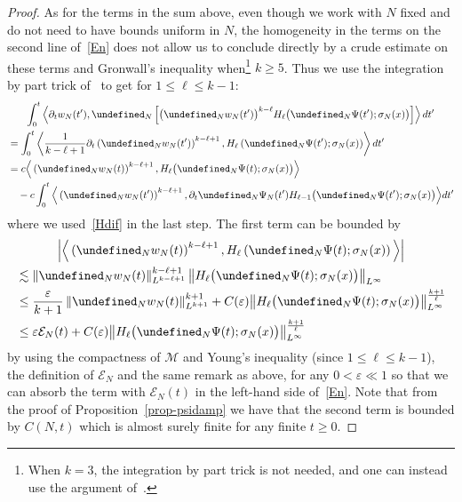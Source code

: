 \documentclass[AHL,Unicode,longabstracts,published]{cedram}
\let\P= \undefined
\newcommand{\P}{\mathbf{P}}
\newcommand{\En}{\mathcal{E}}
\newcommand{\M}{\mathcal{M}}
\newcommand{\eps}{\varepsilon}
\newcommand{\s}{\sigma}
\newcommand{\dt}{\partial_t}
\newcommand{\les}{\lesssim}
\begin{document}
\begin{proof}
As for the terms in the sum above, even though we work with $N$ fixed and do not need to have bounds uniform in $N$, the homogeneity in the terms on the second line of~\eqref{En} does not allow us to conclude directly by a crude estimate on these terms and Gronwall's inequality when\footnote{When $k=3$, the integration by part trick is not needed, and one can instead use the argument of~\cite{BT3}.} $k\ge 5$. Thus we use the integration by part trick of~\cite{OP} to get for $1\le \ell \le k-1$:
\begin{multline*}
\int_0^t\left\langle \dt w_N(t'),\P_N\left[\big(\P_Nw_N(t')\big)^{k-\ell}H_{\ell}\big(\P_N\Psi(t');\s_N(x)\big)\right]\right\rangle dt'\\
\begin{aligned}
& = \int_0^t\left\langle \frac1{k-\ell+1}\dt \left(\P_Nw_N(t')\right)^{k-\ell+1},H_{\ell}\left(\P_N\Psi(t');\s_N(x)\right)\right\rangle dt'\\
& = c\Big\langle \left(\P_Nw_N(t)\right)^{k-\ell+1},H_{\ell}\big(\P_N\Psi(t);\s_N(x)\big)\Big\rangle\\
&\quad- c\int_0^t\Big\langle \left(\P_Nw_N(t')\right)^{k-\ell+1},\dt\P_N\Psi_N(t') H_{\ell-1}\big(\P_N\Psi(t');\s_N(x)\big)\Big\rangle dt'
\end{aligned}
\end{multline*}
where we used~\eqref{Hdif} in the last step. The first term can be bounded by
\begin{multline*}
\Big|\Big\langle \left(\P_Nw_N(t)\right)^{k-\ell+1},H_{\ell}\left(\P_N\Psi(t);\s_N(x)\right)\Big\rangle\Big|\\
\begin{aligned}
&\les \left\|\P_Nw_N(t)\right\|_{L^{k-\ell+1}}^{k-\ell+1}\big\|H_{\ell}\big(\P_N\Psi(t);\s_N(x)\big)\big\|_{L^\infty}\\
&\le \frac{\eps}{k+1} \left\|\P_Nw_N(t)\right\|_{L^{k+1}}^{k+1} + C(\eps)\big\|H_{\ell}\big(\P_N\Psi(t);\s_N(x)\big)\big\|_{L^\infty}^{\frac{k+1}{\ell}}\\
& \le \eps\En_N(t) + C(\eps)\big\|H_{\ell}\big(\P_N\Psi(t);\s_N(x)\big)\big\|_{L^\infty}^{\frac{k+1}{\ell}}
\end{aligned}
\end{multline*}
by using the compactness of $\M$ and Young's inequality (since $1\le \ell \le k-1$), the definition of $\En_N$ and the same remark as above, for any $0<\eps\ll 1$ so that we can absorb the term with $\En_N(t)$ in the left-hand side of~\eqref{En}. Note that from the proof of Proposition~\ref{prop-psidamp} we have that the second term is bounded by $C(N,t)$ which is almost surely finite for any finite $t\ge 0$.


\end{proof}
\end{document}
